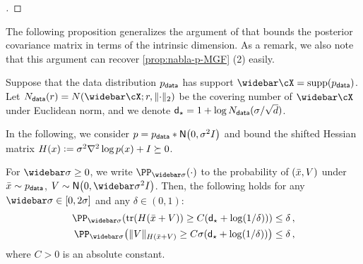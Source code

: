 \begin{proof}[]
\end{proof}




The following proposition generalizes the argument of \citet{huang2024denoising} that bounds the posterior covariance matrix in terms of the intrinsic dimension. As a remark, we also note that this argument can recover \cref{prop:nabla-p-MGF} (2) easily.

\begin{proposition}\label{prop:logp-adapt}
Suppose that the data distribution $p_{\mathsf{data}}$ has support $\cXbar=\supp(\pdata)$. Let $\Ndata(r)=N(\cXbar; r, \nrm{\cdot}_2)$ be the covering number of $\cXbar$ under Euclidean norm, and we denote $\mathsf{d}_\star=1+\log N_{\mathsf{data}}(\sigma/\sqrt{d})$. 

In the following, we consider $p=\pdata*\Nsigma$ and bound the shifted Hessian matrix $H(x)\vcentcolon= \sigma^2\nabla^2 \log p(x)+I\succeq 0$.

For $\sigbar\geq0$, we write $\PP_{\sigbar}(\cdot)$ to the probability of $(\bar{x},V)$ under $\bar{x}\sim p_{\mathsf{data}}$, $V\sim \normal{0,\sigbar^2\Id}$.
Then, the following holds for any $\sigbar\in[0,2\sigma]$ and any $\delta\in(0,1)$:
\begin{align}
    \PP_{\sigbar}\prn*{ \tr(H(\xbar+V))\geq C(\dstar+\log(1/\delta)) }\leq \delta\,, \label{eq:intrinsic-tail}\\
    \PP_{\sigbar}\prn*{ \nrm{V}_{H(\xbar+V)}\geq C\sigma (\dstar+\log(1/\delta))}\leq \delta\,, \label{eq:intrinsic-tail-nrm}
\end{align}
where $C>0$ is an absolute constant. 
\end{proposition}


